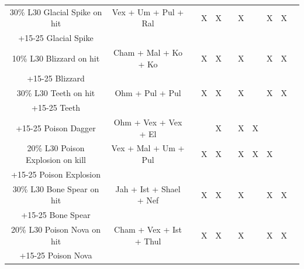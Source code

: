 \documentclass[12pt,a4paper]{article}
\begin{document}
\begin{center}
{\begin{tabular}{|c|c|c|c|c|c|c|c|c|c|c|}
\hline
30\% L30 Glacial Spike on hit&Vex + Um + Pul + Ral&&X&X&&X&&X&X&\\
+15-25 Glacial Spike&&&&&&&&&&\\
\hline
10\% L30 Blizzard on hit&Cham + Mal + Ko + Ko&&X&X&&X&&X&X&\\
+15-25 Blizzard&&&&&&&&&&\\
\hline
30\% L30 Teeth on hit&Ohm +  Pul + Pul&&X&X&&X&&X&X&\\
+15-25 Teeth&&&&&&&&&&\\
\hline
+15-25 Poison Dagger&Ohm + Vex + Vex + El &&&X&&X&X&&&\\
\hline
20\% L30 Poison Explosion on kill&Vex + Mal + Um + Pul&&X&X&&X&X&X&&\\
+15-25 Poison Explosion&&&&&&&&&&\\
\hline
30\% L30 Bone Spear on hit&Jah + Ist + Shael + Nef&&X&X&&X&&X&X&\\
+15-25 Bone Spear&&&&&&&&&&\\
\hline
20\% L30 Poison Nova on hit&Cham + Vex + Ist + Thul&&X&X&&X&&X&X&\\
+15-25 Poison Nova&&&&&&&&&&\\
\hline
\end{tabular}
}
\end{center}
\end{document}
